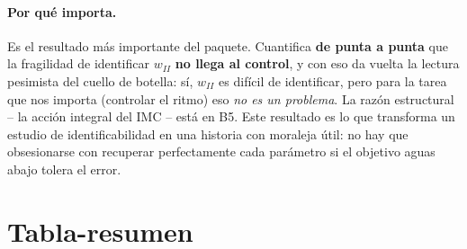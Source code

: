 \documentclass[11pt,a4paper]{article}
\begin{document}
\paragraph{Por qué importa.} Es el resultado más importante del paquete. Cuantifica \textbf{de punta a punta} que la fragilidad de identificar $w_{II}$ \textbf{no llega al control}, y con eso da vuelta la lectura pesimista del cuello de botella: sí, $w_{II}$ es difícil de identificar, pero para la tarea que nos importa (controlar el ritmo) eso \emph{no es un problema}. La razón estructural \--- la acción integral del IMC \--- está en B5. Este resultado es lo que transforma un estudio de identificabilidad en una historia con moraleja útil: no hay que obsesionarse con recuperar perfectamente cada parámetro si el objetivo aguas abajo tolera el error.

\section{Tabla-resumen}
\label{sec:resumen}
\end{document}
